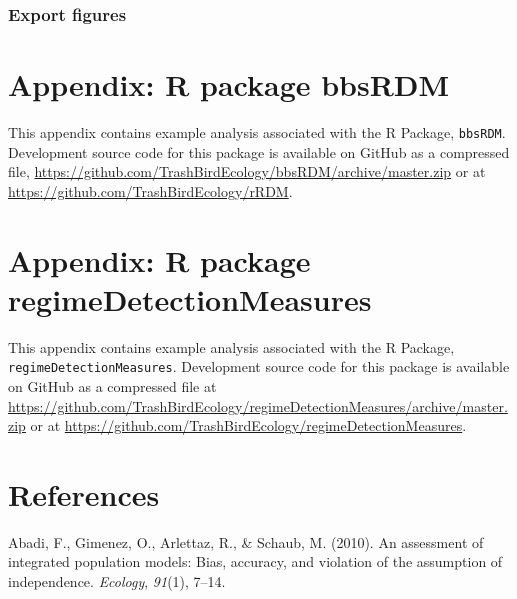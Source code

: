 \documentclass[12pt,twoside,openany]{reedthesis}
\begin{document}
\hypertarget{export-figures}{%
\subsection{Export figures}\label{export-figures}}

\hypertarget{bbsRDM}{%
\chapter*{Appendix: R package bbsRDM}\label{bbsRDM}}

This appendix contains example analysis associated with the R Package, \texttt{bbsRDM}. Development source code for this package is available on GitHub as a compressed file, \url{https://github.com/TrashBirdEcology/bbsRDM/archive/master.zip} or at \url{https://github.com/TrashBirdEcology/rRDM}.

\hypertarget{regimeDetectionMeasures}{%
\chapter*{Appendix: R package regimeDetectionMeasures}\label{regimeDetectionMeasures}}

This appendix contains example analysis associated with the R Package, \texttt{regimeDetectionMeasures}. Development source code for this package is available on GitHub as a compressed file at \url{https://github.com/TrashBirdEcology/regimeDetectionMeasures/archive/master.zip} or at \url{https://github.com/TrashBirdEcology/regimeDetectionMeasures}.

\backmatter

\hypertarget{references}{%
\chapter*{References}\label{references}}


\noindent

\setlength{\parindent}{-0.20in}
\setlength{\leftskip}{0.20in}
\setlength{\parskip}{8pt}

\hypertarget{refs}{}
\leavevmode\hypertarget{ref-abadi2010assessment}{}%
Abadi, F., Gimenez, O., Arlettaz, R., \& Schaub, M. (2010). An assessment of integrated population models: Bias, accuracy, and violation of the assumption of independence. \emph{Ecology}, \emph{91}(1), 7--14.
\end{document}
